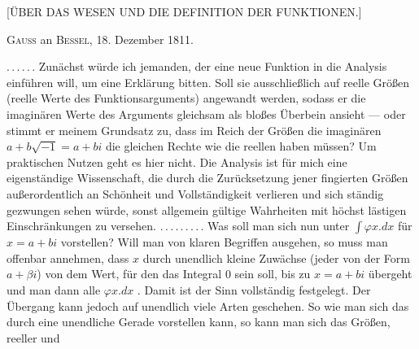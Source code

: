 \clearpage
{}%

\begin{center}
\large [\"UBER DAS WESEN UND DIE DEFINITION DER FUNKTIONEN.]
\end{center}

\begin{center}
\textsc{Gauss} an \textsc{Bessel}, 18. Dezember 1811.
\end{center}

\noindent\hspace*{\parindent}$\mathord{.}\,\mathord{.}\,\mathord{.}\,\mathord{.}\,\mathord{.}\,\mathord{.}$ Zunächst würde ich jemanden, der eine neue Funktion in die Analysis einführen will, um eine Erklärung bitten. Soll sie ausschließlich auf reelle Größen (reelle Werte des Funktionsarguments) angewandt werden, sodass er die imaginären Werte des Arguments gleichsam als bloßes Überbein ansieht --- oder stimmt er meinem Grundsatz zu, dass im Reich der Größen die imaginären $a+b\sqrt{-1}=a+bi$ die gleichen Rechte wie die reellen haben müssen? Um praktischen Nutzen geht es hier nicht. Die Analysis ist für mich eine eigenständige Wissenschaft, die durch die Zurücksetzung jener fingierten Größen außerordentlich an Schönheit und Vollständigkeit verlieren und sich ständig gezwungen sehen würde, sonst allgemein gültige Wahrheiten mit höchst lästigen Einschränkungen zu versehen. $\mathord{.}\,\mathord{.}\,\mathord{.}\,\mathord{.}\,\mathord{.}\,\mathord{.}\,\mathord{.}\,\mathord{.}\,\mathord{.}$ Was soll man sich nun unter $\int \varphi x\mathord{.} dx$ für $x=a+bi$ vorstellen? Will man von klaren Begriffen ausgehen, so muss man offenbar annehmen, dass $x$ durch unendlich kleine Zuwächse (jeder von der Form $a+\beta i$) von dem Wert, für den das Integral 0 sein soll, bis zu $x=a+bi$ übergeht und man dann alle $\varphi x\mathord{.} dx$ . Damit ist der Sinn vollständig festgelegt. Der Übergang kann jedoch auf unendlich viele Arten geschehen. So wie man sich das  durch eine unendliche Gerade vorstellen kann, so kann man sich das  Größen, reeller und
